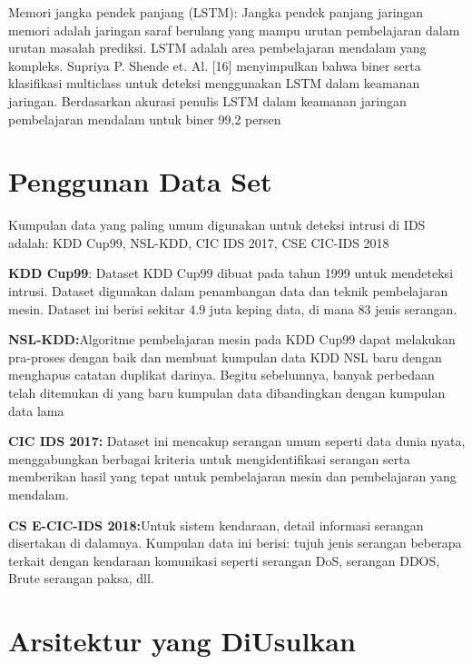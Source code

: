 \documentclass[conference]{IEEEtran}
\begin{document}
Memori jangka pendek panjang (LSTM): Jangka pendek panjang
jaringan memori adalah jaringan saraf berulang yang mampu
urutan pembelajaran dalam urutan masalah prediksi. LSTM adalah
area pembelajaran mendalam yang kompleks. Supriya P. Shende et. Al. [16]\cite{yong2019intrusion}
menyimpulkan bahwa biner serta klasifikasi multiclass
untuk deteksi menggunakan LSTM dalam keamanan jaringan. Berdasarkan
akurasi penulis LSTM dalam keamanan jaringan pembelajaran mendalam
untuk biner 99,2 persen

\section{Penggunan Data Set}
Kumpulan data yang paling umum digunakan untuk deteksi intrusi
di IDS adalah: KDD Cup99, NSL-KDD, CIC IDS 2017, CSE CIC-IDS 2018

\textbf{KDD Cup99}: Dataset KDD Cup99 dibuat pada tahun 1999
untuk mendeteksi intrusi. Dataset digunakan dalam penambangan data dan
teknik pembelajaran mesin. Dataset ini berisi sekitar 4.9
juta keping data, di mana 83%
jenis serangan.

\textbf{NSL-KDD:}Algoritme pembelajaran mesin pada KDD Cup99 dapat melakukan pra-proses dengan baik dan membuat kumpulan data KDD NSL baru dengan menghapus catatan duplikat darinya. Begitu
sebelumnya, banyak perbedaan telah ditemukan di yang baru
kumpulan data dibandingkan dengan kumpulan data lama


\textbf{CIC IDS 2017:} Dataset ini mencakup serangan umum seperti
data dunia nyata, menggabungkan berbagai kriteria untuk mengidentifikasi serangan serta memberikan hasil yang tepat untuk pembelajaran mesin
dan pembelajaran yang mendalam.

\textbf{CS E-CIC-IDS 2018:}Untuk sistem kendaraan, detail
informasi serangan disertakan di dalamnya. Kumpulan data ini berisi:
tujuh jenis serangan beberapa terkait dengan kendaraan
komunikasi seperti serangan DoS, serangan DDOS, Brute
serangan paksa, dll.

\section{Arsitektur yang DiUsulkan}
\end{document}
